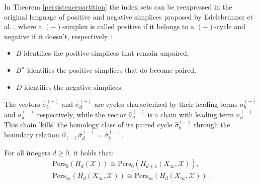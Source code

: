 \begin{remark}
In Theorem \ref{persistencepartition} the index sets can be reexpressed in the original language of positive and negative simplices proposed by Edelsbrunner et al. \cite[p.8]{de2011dualities}, where a $(-)$-simplex is called positive if it belongs to a $(-)$-cycle and negative if it doesn't, respectively \cite[\S 2, p.516]{Edelsbrunner2000}:
\begin{itemize}
	\item $B$ identifies the positive simplices that remain unpaired,
	\item $B^{\Join}$ identifies the positive simplices that do become paired,
	\item $D$ identifies the negative simplices.
\end{itemize}
The vectors $\hat{\sigma}^{(-)}_{b}$ and $\hat{\sigma}^{(-)}_{d}$ are cycles characterized by
their leading terms $\sigma^{(-)}_{b}$ and $\sigma^{(-)}_{d}$ respectively, while the vector
$\hat{\sigma}^{(-)}_{d}$ is a chain with leading term $\sigma^{(-)}_{d}$. This chain 'kills'
the homology class of its paired cycle $\hat{\sigma}^{(-)}_{b}$ through the boundary relation
$\partial_{(-)} \hat{\sigma}^{(-)}_{d} = \hat{\sigma}^{(-)}_{b}$.
\end{remark}

\begin{theorem}{\cite[Proposition 2.4]{de2011dualities}}
	For all integers $d \geq 0$, it holds that:
	\begin{align*}
		\mathrm{Pers}_0(H_{d}(\mathcal{X})) \cong \mathrm{Pers}_0(H_{d+1}(X_\infty, \mathcal{X})), \nonumber\\
		\mathrm{Pers}_\infty(H_{d}(X_{\infty}, \mathcal{X})) \cong \mathrm{Pers}_\infty(H_{d}(X_{\infty}, \mathcal{X})).
	\end{align*}
\end{theorem}

